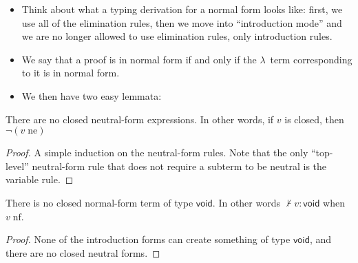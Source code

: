 \documentclass{lecturenotes}
\newcommand{\abs}[2]{\ensuremath{\lambda #1.\,#2}}
\newcommand{\unit}{\ensuremath{\textsf{(}\mkern0.5mu\textsf{)}}}
\newcommand{\pair}[2]{\ensuremath{(#1, #2)}}
\newcommand{\projl}[1]{\ensuremath{\pi_1\mkern2mu#1}}
\newcommand{\projr}[1]{\ensuremath{\pi_2\mkern3mu#1}}
\newcommand{\injl}[1]{\ensuremath{\textsf{inj}_1\mkern2mu#1}}
\newcommand{\injr}[1]{\ensuremath{\textsf{inj}_2\mkern3mu#1}}
\newcommand{\case}[5]{\ensuremath{\textsf{case}\mkern5mu#1\mkern5mu\textsf{of}\mkern5mu\injl{#2} \Rightarrow #3;\mkern5mu\injr{#4} \Rightarrow #5\mkern5mu\textsf{end}}}
\newcommand{\vtype}{\textsf{void}\xspace}
\newcommand{\vcase}[1]{\ensuremath{\textsf{case}\mkern5mu#1\mkern5mu\textsf{of}\mkern5mu\textsf{end}}}
\newcommand{\neutral}[1]{#1\;\text{ne}}
\newcommand{\nf}[1]{#1\;\text{nf}}
\begin{document}

\begin{itemize}
\item Think about what a typing derivation for a normal form looks like: first, we use all of the elimination rules, then we move into ``introduction mode'' and we are no longer allowed to use elimination rules, only introduction rules.
\item We say that a proof is in normal form if and only if the $\lambda$~term corresponding to it is in normal form.
\item We then have two easy lemmata:
\end{itemize}

\begin{lem}
  There are no closed neutral-form expressions.
  In other words, if $v$ is closed, then $\lnot (\neutral{v})$ 
\end{lem}
\begin{proof}
  A simple induction on the neutral-form rules.
  Note that the only ``top-level'' neutral-form rule that does not require a subterm to be neutral is the variable rule.
\end{proof}

\begin{lem}
  There is no closed normal-form term of type $\vtype$.
  In other words $\not\vdash v : \vtype$ when $\nf{v}$.
\end{lem}
\begin{proof}
  None of the introduction forms can create something of type $\vtype$, and there are no closed neutral forms.
\end{proof}
\end{document}
